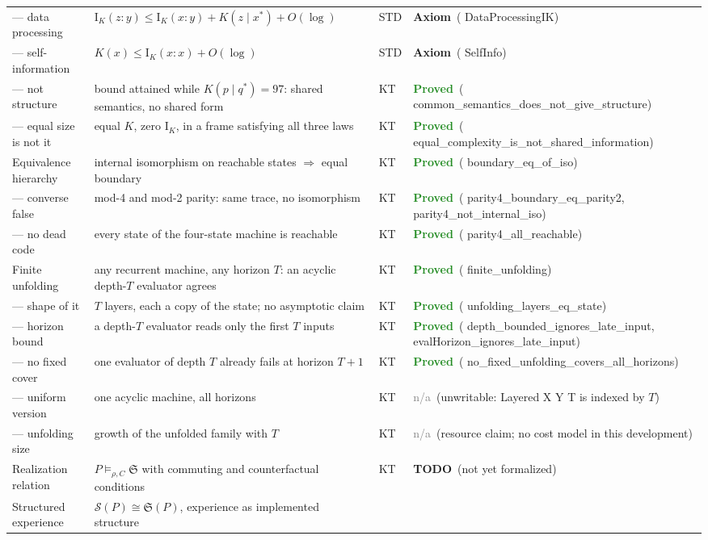 \documentclass[11pt,a4paper]{article}
\newcommand{\lean}[1]{{\ttfamily\small
  \let\leanunderscore\_\def\_{\leanunderscore\allowbreak}#1}}
\newcommand{\Ik}{\mathrm{I}_K}
\newcommand{\stproved}{\textcolor{ForestGreen}{\textbf{Proved}}}
\newcommand{\staxiom}{\textcolor{bcomblue}{\textbf{Axiom}}}
\newcommand{\sttodo}{\textcolor{bcomcoral}{\textbf{TODO}}}
\newcommand{\stna}{\textcolor{gray}{n/a}}
\begin{document}
{\begin{longtable}{@{}p{2.1cm}p{6.6cm}p{1.0cm}p{2.6cm}@{}}
--- data processing & $\Ik(z{:}y)\le\Ik(x{:}y)+K(z\mid x^\ast)+O(\log)$ & STD &
  \staxiom\ (\lean{DataProcessingIK}) \\
--- self-information & $K(x)\le\Ik(x{:}x)+O(\log)$ & STD &
  \staxiom\ (\lean{SelfInfo}) \\
--- not structure & bound attained while $K(p\mid q^\ast)=97$: shared semantics, no shared form
  & KT & \stproved\ (\lean{common\_semantics\_does\_not\_give\_structure}) \\
--- equal size is not it & equal $K$, zero $\Ik$, in a frame satisfying all three laws & KT &
  \stproved\ (\lean{equal\_complexity\_is\_not\_shared\_information}) \\
Equivalence hierarchy & internal isomorphism on reachable states $\Rightarrow$ equal boundary &
  KT & \stproved\ (\lean{boundary\_eq\_of\_iso}) \\
--- converse false & mod-4 and mod-2 parity: same trace, no isomorphism & KT &
  \stproved\ (\lean{parity4\_boundary\_eq\_parity2}, \lean{parity4\_not\_internal\_iso}) \\
--- no dead code & every state of the four-state machine is reachable & KT &
  \stproved\ (\lean{parity4\_all\_reachable}) \\
Finite unfolding & any recurrent machine, any horizon $T$: an acyclic depth-$T$ evaluator agrees
  & KT & \stproved\ (\lean{finite\_unfolding}) \\
--- shape of it & $T$ layers, each a copy of the state; no asymptotic claim & KT &
  \stproved\ (\lean{unfolding\_layers\_eq\_state}) \\
--- horizon bound & a depth-$T$ evaluator reads only the first $T$ inputs & KT &
  \stproved\ (\lean{depth\_bounded\_ignores\_late\_input}, \lean{evalHorizon\_ignores\_late\_input}) \\
--- no fixed cover & one evaluator of depth $T$ already fails at horizon $T+1$ & KT &
  \stproved\ (\lean{no\_fixed\_unfolding\_covers\_all\_horizons}) \\
--- uniform version & one acyclic machine, all horizons & KT &
  \stna\ (unwritable: \lean{Layered X Y T} is indexed by $T$) \\
--- unfolding size & growth of the unfolded family with $T$ & KT &
  \stna\ (resource claim; no cost model in this development) \\
Realization relation & $P\models_{\rho,C}\mathfrak{S}$ with commuting and counterfactual
  conditions & KT & \sttodo\ (not yet formalized) \\
Structured experience & $\mathcal{S}(P)\cong\mathfrak{S}(P)$, experience as implemented structure

\end{longtable}}
\end{document}
